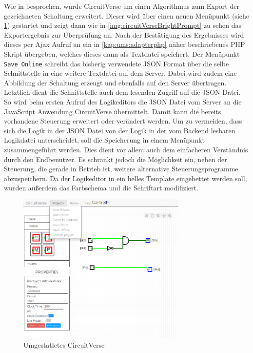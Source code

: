 Wie in  besprochen, wurde CircuitVerse um einen Algorithmus zum Export der gezeichneten Schaltung erweitert. Dieser wird über einen neuen Menüpunkt (siehe \ref{img:circuitVerseBright}) gestartet und zeigt dann wie in \autoref{img:circuitVerseBrightPrompt} zu sehen das Exportergebnis zur Überprüfung an. Nach der Bestätigung des Ergebnisses wird dieses per Ajax Aufruf an ein in \autoref{kap:ums:adapterphp} näher beschriebenes PHP Skript übergeben, welches dieses dann als Textdatei speichert. Der Menüpunkt \texttt{Save Online} schreibt das bisherig verwendete JSON Format über die selbe Schnittstelle in eine weitere Textdatei auf dem Server. Dabei wird zudem eine Abbildung der Schaltung erzeugt und ebenfalls auf den Server übertragen. Letztlich dient die Schnittstelle auch dem lesenden Zugriff auf die JSON Datei. So wird beim ersten Aufruf des Logikeditors die JSON Datei vom Server an die JavaScript Anwendung CircuitVerse übermittelt. Damit kann die bereits vorhandene Steuerung erweitert oder verändert werden. Um zu vermeiden, dass sich die Logik in der JSON Datei von der Logik in der vom Backend lesbaren Logikdatei unterscheidet, soll die Speicherung in einem Menüpunkt zusammengeführt werden. Dies dient vor allem auch dem einfacheren Verständnis durch den Endbenutzer. Es schränkt jedoch die Möglichkeit ein, neben der Steuerung, die gerade in Betrieb ist, weitere alternative Steuerungsprogramme abzuspeichern. Da der Logikeditor in ein helles Template eingebettet werden soll, wurden außerdem das Farbschema und die Schriftart modifiziert. 
 

\begin{figure}[H]
	\begin{center}
		\includegraphics[width=0.75\textwidth ,clip]{./images/circuitverseLogicBright.png}
		\caption{Umgestatletes CircuitVerse}
		\label{img:circuitVerseBright}
	\end{center} 
\end{figure}

